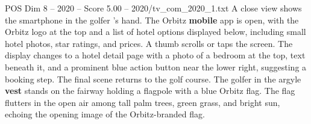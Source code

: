 \begin{textsample}{POS Dim 8 – 2020 – Score 5.00 – 2020/tv\_com\_2020\_1.txt}
A close view shows the smartphone in the golfer ’s hand.
The Orbitz \textbf{mobile} app is open, with the Orbitz logo at the top and a list of hotel options displayed below, including small hotel photos, star ratings, and prices.
A thumb scrolls or taps the screen.
The display changes to a hotel detail page with a photo of a bedroom at the top, text beneath it, and a prominent blue action button near the lower right, suggesting a booking step.
The final scene returns to the golf course.
The golfer in the argyle \textbf{vest} stands on the fairway holding a flagpole with a blue Orbitz flag.
The flag flutters in the open air among tall palm trees, green grass, and bright sun, echoing the opening image of the Orbitz-branded flag.

\end{textsample}
